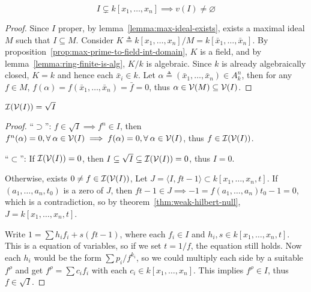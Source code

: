 \begin{theorem} \label{thm:weak-hilbert-null}
  \[ I \subsetneq k[x_1, \dots, x_n] \implies v(I) \neq \varnothing \]

  \begin{proof}
    Since $I$ proper, by lemma~\ref{lemma:max-ideal-exists},
    exists a maximal ideal $M$ such that $I \subseteq M$.
    Consider $K \triangleq k[x_1, \dots, x_n] / M = k[\bar{x}_1, \dots, \bar{x}_n]$.
    By proposition~\ref{prop:max-prime-to-field-int-domain}, $K$ is a field,
    and by lemma~\ref{lemma:ring-finite-is-alg}, $K/k$ is algebraic. Since $k$
    is already algebraically closed, $K = k$ and hence each $\bar{x}_i \in k$.
    Let $\alpha \triangleq (\bar{x}_1, \dots, \bar{x}_n) \in A_k^n$, then
    for any $f \in M$, $f(\alpha) = f(\bar{x}_1, \dots, \bar{x}_n) = \bar{f} = 0$,
    thus $\alpha \in \mathcal{V}(M) \subseteq \mathcal{V}(I)$.
  \end{proof}
\end{theorem}

\begin{theorem} \label{thm:strong-hilbert-null}
  $\mathcal{I}(\mathcal{V}(I)) = \sqrt{I}$

  \begin{proof}
    ``$\supset$'': $f \in \sqrt{I} \implies f^n \in I$, then
    $f^n(\alpha) = 0, \forall \alpha \in \Vc(I)
    \implies f(\alpha) = 0, \forall \alpha \in \Vc(I)$, thus $f \in \mathcal{I}(\mathcal{V}(I))$.

    ``$\subset$'': If $\mathcal{I}(\mathcal{V}(I)) = 0$, then $I \subseteq \sqrt{I} \subseteq \mathcal{I}(\mathcal{V}(I)) = 0$,
    thus $I = 0$.

    Otherwise, exists $0 \neq f \in \mathcal{I}(\mathcal{V}(I))$, Let $J = \langle I, ft-1 \rangle \subset k[x_1, \dots, x_n, t]$.
    If $(a_1, \dots, a_n, t_0)$ is a zero of $J$, then $ft-1 \in J \implies -1 = f(a_1, \dots, a_n) t_0 - 1 =
    0$, which is a contradiction, so by theorem~\ref{thm:weak-hilbert-null}, $J = k[x_1, \dots, x_n, t]$.

    Write $1 = \sum h_i f_i + s (ft-1)$, where each $f_i \in I$ and
    $h_i, s \in k[x_1, \dots, x_n, t]$.
    This is a equation of variables, so if we set $t = 1/f$, the equation still holds.
    Now each $h_i$ would be the form $\sum p_i / f^{k_i}$, so we could multiply each
    side by a suitable $f^\rho$ and get $f^\rho = \sum c_i f_i$ with each $c_i \in k[x_1, \dots, x_n]$.
    This implies $f^\rho \in I$, thus $f \in \sqrt{I}$.
  \end{proof}
\end{theorem}

